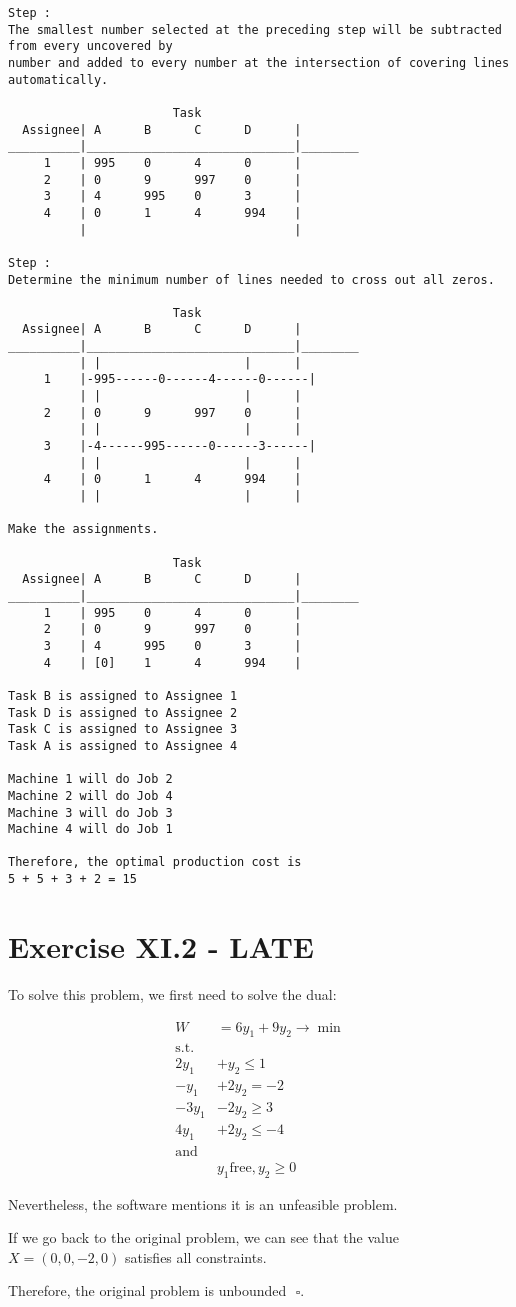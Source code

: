 \documentclass[titlepage, letterpaper]{article}
\newcommand{\qed}{\,\,\square}
\begin{document}
\begin{lstlisting}[basicstyle=\tiny]
Step :
The smallest number selected at the preceding step will be subtracted from every uncovered by 
number and added to every number at the intersection of covering lines automatically. 

                       Task
  Assignee| A      B      C      D      |
__________|_____________________________|________
     1    | 995    0      4      0      | 
     2    | 0      9      997    0      | 
     3    | 4      995    0      3      | 
     4    | 0      1      4      994    | 
          |                             | 

Step :
Determine the minimum number of lines needed to cross out all zeros.

                       Task
  Assignee| A      B      C      D      |
__________|_____________________________|________
          | |                    |      |
     1    |-995------0------4------0------|
          | |                    |      |
     2    | 0      9      997    0      |
          | |                    |      |
     3    |-4------995------0------3------|
          | |                    |      |
     4    | 0      1      4      994    |
          | |                    |      |

Make the assignments.

                       Task
  Assignee| A      B      C      D      |
__________|_____________________________|________
     1    | 995    0      4      0      | 
     2    | 0      9      997    0      | 
     3    | 4      995    0      3      | 
     4    | [0]    1      4      994    | 

Task B is assigned to Assignee 1
Task D is assigned to Assignee 2
Task C is assigned to Assignee 3
Task A is assigned to Assignee 4

Machine 1 will do Job 2
Machine 2 will do Job 4
Machine 3 will do Job 3
Machine 4 will do Job 1

Therefore, the optimal production cost is
5 + 5 + 3 + 2 = 15
\end{lstlisting}


\section{Exercise XI.2 - LATE} %
\label{sec:exercise_xi_2}

To solve this problem, we first need to solve the dual:

\begin{align*}
    W & = 6y_1 + 9y_2 \to \min \\
    \text{s.t.} \\
    2y_1 & + y_2 \leq 1 \\
    -y_1 & + 2y_2 = -2 \\
    -3y_1 & -2y_2 \geq 3 \\
    4y_1 & + 2y_2 \leq -4 \\
    \text{and} \\
    & y_1 \text{free}, y_2 \geq 0
\end{align*}

Nevertheless, the software mentions it is an unfeasible problem.

If we go back to the original problem, we can see that the value $X= (0,0,-2,0)$ satisfies all constraints.

Therefore, the original problem is unbounded $\qed$.

\end{document}
